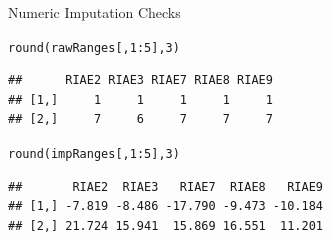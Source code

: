 \documentclass{beamer}\usepackage[]{graphicx}\usepackage[]{color}
\makeatletter
\newcommand{\hlnum}[1]{\textcolor[rgb]{0.69,0.494,0}{#1}}%
\newcommand{\hlopt}[1]{\textcolor[rgb]{0,0,0}{#1}}%
\newcommand{\hlstd}[1]{\textcolor[rgb]{0,0,0}{#1}}%
\newcommand{\hlkwd}[1]{\textcolor[rgb]{0.004,0.004,0.506}{#1}}%
\newenvironment{kframe}{%
 \def\at@end@of@kframe{}%
 \ifinner\ifhmode%
  \def\at@end@of@kframe{\end{minipage}}%
  \begin{minipage}{\columnwidth}%
 \fi\fi%
 \def\FrameCommand##1{\hskip\@totalleftmargin \hskip-\fboxsep
 \colorbox{shadecolor}{##1}\hskip-\fboxsep
     \hskip-\linewidth \hskip-\@totalleftmargin \hskip\columnwidth}%
 \MakeFramed {\advance\hsize-\width
   \@totalleftmargin\z@ \linewidth\hsize
   \@setminipage}}%
 {\par\unskip\endMakeFramed%
 \at@end@of@kframe}
\newenvironment{knitrout}{}{} %
\makeatother
\begin{document}
\begin{frame}{Numeric Imputation Checks}
\begin{knitrout}\footnotesize
{}\color{fgcolor}\begin{kframe}
\begin{alltt}
\hlkwd{round}\hlstd{(rawRanges[ ,} \hlnum{1} \hlopt{:} \hlnum{5}\hlstd{],} \hlnum{3}\hlstd{)}
\end{alltt}
\begin{verbatim}
##      RIAE2 RIAE3 RIAE7 RIAE8 RIAE9
## [1,]     1     1     1     1     1
## [2,]     7     6     7     7     7
\end{verbatim}
\begin{alltt}
\hlkwd{round}\hlstd{(impRanges[ ,} \hlnum{1} \hlopt{:} \hlnum{5}\hlstd{],} \hlnum{3}\hlstd{)}
\end{alltt}
\begin{verbatim}
##       RIAE2  RIAE3   RIAE7  RIAE8   RIAE9
## [1,] -7.819 -8.486 -17.790 -9.473 -10.184
## [2,] 21.724 15.941  15.869 16.551  11.201
\end{verbatim}
\end{kframe}
\end{knitrout}

\end{frame}

\end{document}
